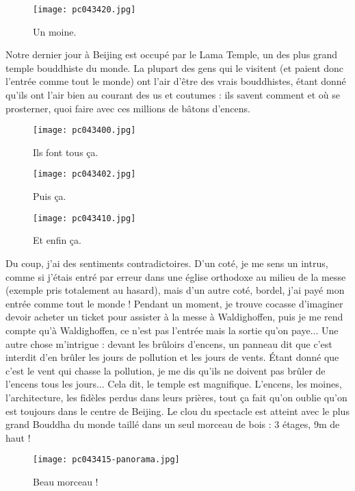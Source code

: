 \documentclass{book}
\begin{document}
\begin{figure}[h]
\centering
\texttt{[image: pc043420.jpg]}
\caption*{ Un moine.}
\end{figure}

Notre dernier jour à Beijing est occupé par le Lama Temple, un des plus grand temple bouddhiste du monde. La plupart des gens qui le visitent (et paient donc l'entrée comme tout le monde) ont l'air d'être des vrais bouddhistes, étant donné qu'ils ont l'air bien au courant des us et coutumes : ils savent comment et où se prosterner, quoi faire avec ces millions de bâtons d’encens.


\begin{figure}[h]
\centering
\texttt{[image: pc043400.jpg]}
\caption*{ Ils font tous ça.}
\end{figure}


\begin{figure}[h]
\centering
\texttt{[image: pc043402.jpg]}
\caption*{ Puis ça.}
\end{figure}


\begin{figure}[h]
\centering
\texttt{[image: pc043410.jpg]}
\caption*{ Et enfin ça.}
\end{figure}

Du coup, j'ai des sentiments contradictoires. D'un coté, je me sens un intrus, comme si j'étais entré par erreur dans une église orthodoxe au milieu de la messe (exemple pris totalement au hasard), mais d'un autre coté, bordel, j'ai payé mon entrée comme tout le monde ! Pendant un moment, je trouve cocasse d'imaginer devoir acheter un ticket pour assister à la messe à Waldighoffen, puis je me rend compte qu'à Waldighoffen, ce n'est pas l'entrée mais la sortie qu'on paye... Une autre chose m'intrigue : devant les brûloirs d’encens, un panneau dit que c'est interdit d'en brûler les jours de pollution et les jours de vents. Étant donné que c'est le vent qui chasse la pollution, je me dis qu'ils ne doivent pas brûler de l’encens tous les jours... Cela dit, le temple est magnifique. L’encens, les moines, l'architecture, les fidèles perdus dans leurs prières, tout ça fait qu'on oublie qu'on est toujours dans le centre de Beijing. Le clou du spectacle est atteint avec le plus grand Bouddha du monde taillé dans un seul morceau de bois : 3 étages, 9m de haut !


\begin{figure}[h]
\centering
\texttt{[image: pc043415-panorama.jpg]}
\caption*{ Beau morceau !}
\end{figure}
\end{document}
